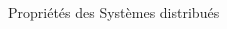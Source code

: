 \documentclass[presentation]{beamer}
\begin{document}
\begin{frame}[label={sec:orgb3001bc}]{Propriétés des Systèmes distribués}
\begin{columns}
\begin{column}{0.46\columnwidth}
\begin{block}
\end{block}
\end{column}
\end{columns}
\end{frame}
\end{document}
